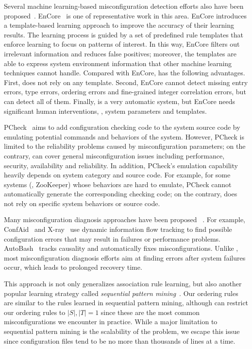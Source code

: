 Several machine learning-based misconfiguration detection efforts 
also have been proposed~\cite{yuan11context, zhang14encore}.
EnCore~\cite{zhang14encore} is one of representative work in this area.
EnCore introduces a template-based
learning approach to improve the accuracy of their learning results.
The learning process is guided by a set of predefined rule templates
that enforce learning to focus on patterns of interest.
In this way, EnCore filters out irrelevant information and reduces
false positives; moreover, the templates are able to express
system environment information that other machine learning
techniques cannot handle.
Compared with EnCore, \app has the following advantages.
First, \app does not rely on any template. 
Second, EnCore cannot detect missing entry errors, type errors,
ordering errors and fine-grained integer correlation errors,
but \app can detect all of them.
Finally, \app is a very automatic system, but
EnCore needs significant human interventions, \eg, system parameters
and templates.

PCheck~\cite{xu16early} aims to add configuration checking code to
the system source code by emulating potential commands and behaviors
of the system. However, PCheck is limited to the reliability problems
caused by misconfiguration parameters; on the contrary, 
\app can cover general misconfiguration issues 
including performance, security, availability and reliability.
In addition, PCheck's emulation capability heavily depends on 
system category and source code.
For example, for some systems (\eg, ZooKeeper) whose behaviors are 
hard to emulate, PCheck cannot automatically generate the corresponding
checking code; on the contrary, \app does not rely on specific
system behaviors or source code.

Many misconfiguration diagnosis approaches have been proposed%
~\cite{attariyan10automating, attariyan12x-ray}.
For example, ConfAid~\cite{attariyan10automating} 
and X-ray~\cite{attariyan12x-ray} use dynamic information
flow tracking to find possible configuration errors that may result in
failures or performance problems. AutoBash~\cite{su07autobash} 
tracks causality and automatically fixes 
misconfigurations. Unlike \app, most misconfiguration
diagnosis efforts aim at finding errors after system
failures occur, which leads to prolonged recovery time.


This approach is not only generalizes association rule learning, but also another popular learning strategy called \textit{sequential pattern mining}~\cite{seqMine}.
Our ordering rules are similar to the rules learned in sequential pattern mining, although can restrict our ordering rules to $|S|,|T|=1$ since these are the most common misconfigurations we encounter in practice.
While a major limitation to sequential pattern mining is the scalability of the problem, we escape this issue since configuration files tend to be no more than thousands of lines at a time.
